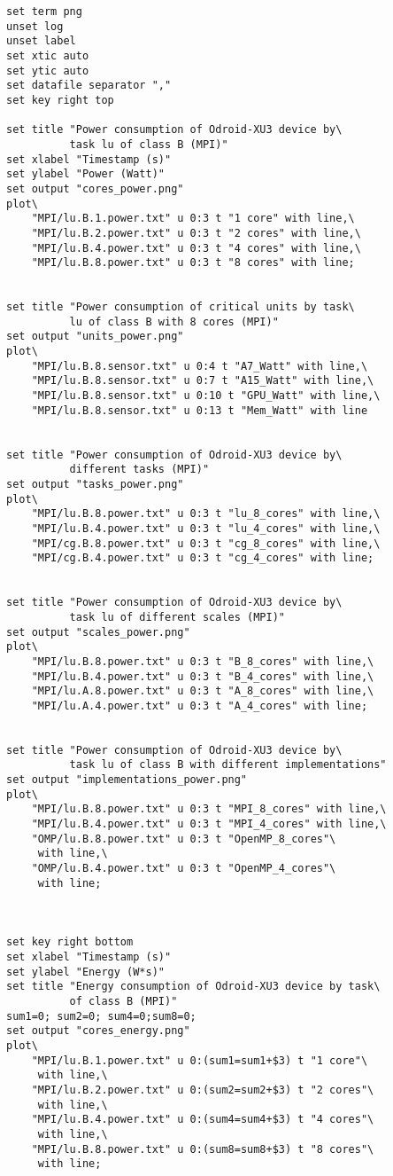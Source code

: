\begin{lstlisting}[label=lst:draw.p, caption={draw.p}]
set term png
unset log
unset label
set xtic auto
set ytic auto
set datafile separator ","
set key right top

set title "Power consumption of Odroid-XU3 device by\
          task lu of class B (MPI)"
set xlabel "Timestamp (s)"
set ylabel "Power (Watt)"
set output "cores_power.png"
plot\
    "MPI/lu.B.1.power.txt" u 0:3 t "1 core" with line,\
    "MPI/lu.B.2.power.txt" u 0:3 t "2 cores" with line,\
    "MPI/lu.B.4.power.txt" u 0:3 t "4 cores" with line,\
    "MPI/lu.B.8.power.txt" u 0:3 t "8 cores" with line;


set title "Power consumption of critical units by task\
          lu of class B with 8 cores (MPI)"
set output "units_power.png"
plot\
    "MPI/lu.B.8.sensor.txt" u 0:4 t "A7_Watt" with line,\
    "MPI/lu.B.8.sensor.txt" u 0:7 t "A15_Watt" with line,\
    "MPI/lu.B.8.sensor.txt" u 0:10 t "GPU_Watt" with line,\
    "MPI/lu.B.8.sensor.txt" u 0:13 t "Mem_Watt" with line


set title "Power consumption of Odroid-XU3 device by\
          different tasks (MPI)"
set output "tasks_power.png"
plot\
    "MPI/lu.B.8.power.txt" u 0:3 t "lu_8_cores" with line,\
    "MPI/lu.B.4.power.txt" u 0:3 t "lu_4_cores" with line,\
    "MPI/cg.B.8.power.txt" u 0:3 t "cg_8_cores" with line,\
    "MPI/cg.B.4.power.txt" u 0:3 t "cg_4_cores" with line;


set title "Power consumption of Odroid-XU3 device by\
          task lu of different scales (MPI)"
set output "scales_power.png"
plot\
    "MPI/lu.B.8.power.txt" u 0:3 t "B_8_cores" with line,\
    "MPI/lu.B.4.power.txt" u 0:3 t "B_4_cores" with line,\
    "MPI/lu.A.8.power.txt" u 0:3 t "A_8_cores" with line,\
    "MPI/lu.A.4.power.txt" u 0:3 t "A_4_cores" with line;
    

set title "Power consumption of Odroid-XU3 device by\
          task lu of class B with different implementations"
set output "implementations_power.png"
plot\
    "MPI/lu.B.8.power.txt" u 0:3 t "MPI_8_cores" with line,\
    "MPI/lu.B.4.power.txt" u 0:3 t "MPI_4_cores" with line,\
    "OMP/lu.B.8.power.txt" u 0:3 t "OpenMP_8_cores"\
     with line,\
    "OMP/lu.B.4.power.txt" u 0:3 t "OpenMP_4_cores"\
     with line;



set key right bottom
set xlabel "Timestamp (s)"
set ylabel "Energy (W*s)"
set title "Energy consumption of Odroid-XU3 device by task\
          of class B (MPI)"
sum1=0; sum2=0; sum4=0;sum8=0;
set output "cores_energy.png"
plot\
    "MPI/lu.B.1.power.txt" u 0:(sum1=sum1+$3) t "1 core"\
     with line,\
    "MPI/lu.B.2.power.txt" u 0:(sum2=sum2+$3) t "2 cores"\
     with line,\
    "MPI/lu.B.4.power.txt" u 0:(sum4=sum4+$3) t "4 cores"\
     with line,\
    "MPI/lu.B.8.power.txt" u 0:(sum8=sum8+$3) t "8 cores"\
     with line;



\end{lstlisting}

